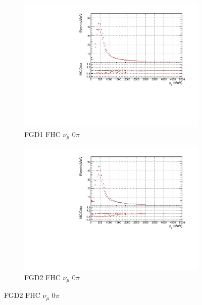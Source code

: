 \begin{figure}[!htbp]
\begin{subfigure}{0.49\textwidth}
  \centering
  \includegraphics[width=\textwidth]{figs/prioronly1D_p_FGD1_numuCC_0pi}
  \caption{FGD1 FHC $\nu_{\mu}$ 0$\pi$}
\end{subfigure}
\begin{subfigure}{0.49\textwidth}
  \centering
  \includegraphics[width=\textwidth]{figs/prioronly1D_p_FGD2_numuCC_0pi}
  \caption{FGD2 FHC $\nu_{\mu}$ 0$\pi$}
\end{subfigure}


\end{figure}
